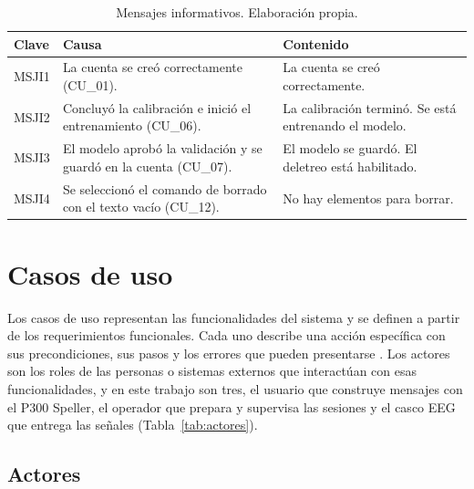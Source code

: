 \begin{table}[H]
\centering
\small
\begin{tabularx}{\textwidth}{|L{1.5cm}|L{5.4cm}|Y|}
\hline
\textbf{Clave} & \textbf{Causa} & \textbf{Contenido} \\
\hline
MSJI1 & La cuenta se creó correctamente (CU\_01). & La cuenta se creó correctamente. \\
\hline
MSJI2 & Concluyó la calibración e inició el entrenamiento (CU\_06). & La calibración terminó. Se está entrenando el modelo. \\
\hline
MSJI3 & El modelo aprobó la validación y se guardó en la cuenta (CU\_07). & El modelo se guardó. El deletreo está habilitado. \\
\hline
MSJI4 & Se seleccionó el comando de borrado con el texto vacío (CU\_12). & No hay elementos para borrar. \\
\hline
\end{tabularx}
\caption{Mensajes informativos. Elaboración propia.}
\label{tab:msji}
\end{table}


\section[CASOS DE USO]{Casos de uso}
\label{sec:casos-uso}

Los casos de uso representan las funcionalidades del sistema y se definen a partir de los
requerimientos funcionales. Cada uno describe una acción específica con sus precondiciones, sus
pasos y los errores que pueden presentarse \cite{pressman2010}. Los actores son los roles de las
personas o sistemas externos que interactúan con esas funcionalidades, y en este trabajo son tres,
el usuario que construye mensajes con el P300 Speller, el operador que prepara y supervisa las
sesiones y el casco EEG que entrega las señales (Tabla~\ref{tab:actores}).

\subsection{Actores}

